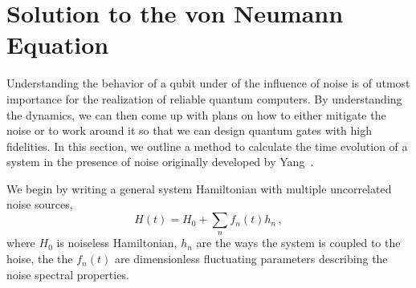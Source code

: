 \section{Solution to the von Neumann Equation}\label{SEC:von_neumann}

Understanding the behavior of a qubit under of the influence of noise is of utmost importance for the realization of reliable quantum computers.
By understanding the dynamics, we can then come up with plans on how to either mitigate the noise or to work around it so that we can design quantum gates with high fidelities.
In this section, we outline a method to calculate the time evolution of a system in the presence of noise originally developed by Yang~\cite{yang_2019}.

We begin by writing a general system Hamiltonian with multiple uncorrelated noise sources,
\begin{equation}
    H(t) = H_0 + \sum_n f_n(t)h_n \,,
\end{equation}
where $H_0$ is noiseless Hamiltonian, $h_n$ are the ways the system is coupled to the hoise, the the $f_n(t)$ are dimensionless fluctuating parameters describing the noise spectral properties.

